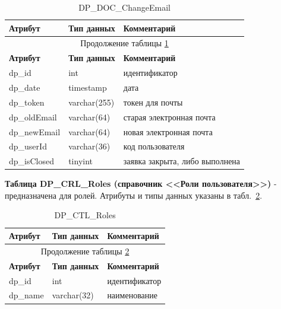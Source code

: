 \begin{longtable}{|p{5.5cm}|p{3.5cm}|p{7.5cm}|}
    \caption{DP\_DOC\_ChangeEmail} \label{tab:DP_DOC_ChangeEmail} \\
    \hline
    \textbf{Атрибут} & \textbf{Тип данных} & \textbf{Комментарий} \\ \hline
    \endfirsthead

    \multicolumn{3}{c}{Продолжение таблицы \ref{tab:DP_DOC_ChangeEmail}} \\
    \hline
    \textbf{Атрибут} & \textbf{Тип данных} & \textbf{Комментарий} \\ \hline
    \endhead

    \endfoot

    \endlastfoot
    dp\_id & int & идентификатор \\ \hline
    dp\_date & timestamp & дата \\ \hline
    dp\_token & varchar(255) & токен для почты \\ \hline
    dp\_oldEmail & varchar(64) & старая электронная почта \\ \hline
    dp\_newEmail & varchar(64) & новая электронная почта \\ \hline
    dp\_userId & varchar(36) & код пользователя \\ \hline
    dp\_isClosed & tinyint & заявка закрыта, либо выполнена \\ \hline
\end{longtable}

\textbf{Таблица DP\_CRL\_Roles (справочник <<Роли пользователя>>)} - предназначена для ролей.
Атрибуты и типы данных указаны в табл.~\ref{tab:DP_CTL_Roles}.

\begin{longtable}{|p{5.5cm}|p{3.5cm}|p{7.5cm}|}
    \caption{DP\_CTL\_Roles} \label{tab:DP_CTL_Roles} \\
    \hline
    \textbf{Атрибут} & \textbf{Тип данных} & \textbf{Комментарий} \\ \hline
    \endfirsthead

    \multicolumn{3}{c}{Продолжение таблицы \ref{tab:DP_CTL_Roles}} \\
    \hline
    \textbf{Атрибут} & \textbf{Тип данных} & \textbf{Комментарий} \\ \hline
    \endhead

    \endfoot

    \endlastfoot
    dp\_id & int & идентификатор \\ \hline
    dp\_name & varchar(32) & наименование \\ \hline
\end{longtable}

